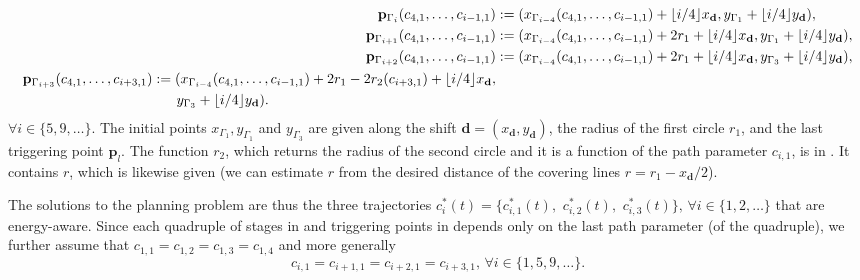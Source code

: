 \begin{subequations}\label{eq:ex-pb-trigs}\begin{align}
  \mathbf{p}_{\Gamma_i}(c_{4,1},\dots,c_{i-1,1})&:=(x_{\Gamma_{i-4}}(c_{4,1},\dots,c_{i-1,1})+\lfloor i/4\rfloor x_\mathbf{d},y_{\Gamma_1}+\lfloor i/4\rfloor y_\mathbf{d}),\\
  \mathbf{p}_{\Gamma_{i+1}}(c_{4,1},\dots,c_{i-1,1})&:=(x_{\Gamma_{i-4}}(c_{4,1},\dots,c_{i-1,1})+2r_1+\lfloor i/4\rfloor x_\mathbf{d},y_{\Gamma_1}+\lfloor i/4\rfloor y_\mathbf{d}),\hspace*{-1ex}\\
  \mathbf{p}_{\Gamma_{i+2}}(c_{4,1},\dots,c_{i-1,1})&:=(x_{\Gamma_{i-4}}(c_{4,1},\dots,c_{i-1,1})+2r_1+\lfloor i/4\rfloor x_\mathbf{d},y_{\Gamma_3}+\lfloor i/4\rfloor y_\mathbf{d}),\\
  \begin{split}
  \mathbf{p}_{\Gamma_{i+3}}(c_{4,1},\dots,c_{i+3,1})&:=(x_{\Gamma_{i-4}}(c_{4,1},\dots,c_{i-1,1})+2r_1-2r_2(c_{i+3,1})+\lfloor i/4\rfloor x_\mathbf{d},\\
  &\hspace*{4ex}y_{\Gamma_3}+\lfloor i/4\rfloor y_\mathbf{d}).\end{split}
\end{align}
\end{subequations}
$\forall i\in\{5,9,\dots\}$. The initial points $x_{\Gamma_1},y_{\Gamma_1}$ and $y_{\Gamma_3}$ are given along the shift $\mathbf{d}=(x_\mathbf{d},y_\mathbf{d})$, the radius of the first circle $r_1$, and the last triggering point $\mathbf{p}_l$. The function $r_2$, which returns the radius of the second circle and it is a function of the path parameter $c_{i,1}$, is in . It contains $r$, which is likewise given (we can estimate $r$ from the desired distance of the covering lines $r=r_1-x_\mathbf{d}/2$).

The solutions to the planning problem are thus the three trajectories $c_i^*(t)=\{c_{i,1}^*(t),$ $c_{i,2}^*(t),$ $c_{i,3}^*(t)\},\,\forall i\in\{1,2,\dots\}$ that are energy-aware. 
Since each quadruple of stages in  and triggering points in  depends only on the last path parameter (of the quadruple), we further assume that $c_{1,1}=c_{1,2}=c_{1,3}=c_{1,4}$ and more generally 
\begin{equation}\label{eq:very-last-assmp}
c_{i,1}=c_{i+1,1}=c_{i+2,1}=c_{i+3,1},\,\forall i\in\{1,5,9,\dots\}.
\end{equation}

